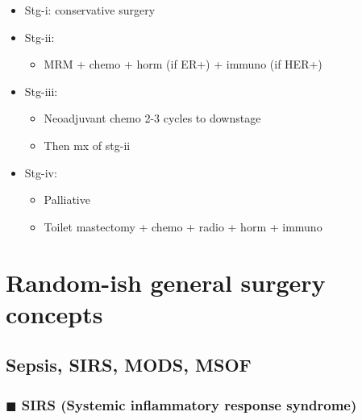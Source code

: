 \documentclass[
  14pt,
]{extarticle}
\providecommand{\tightlist}{%
  \setlength{\itemsep}{0pt}\setlength{\parskip}{0pt}}
\begin{document}
\begin{itemize}
\tightlist
\item
  Stg-i: conservative surgery
\item
  Stg-ii:

  \begin{itemize}
  \tightlist
  \item
    MRM + chemo + horm (if ER+) + immuno (if HER+)
  \end{itemize}
\item
  Stg-iii:

  \begin{itemize}
  \tightlist
  \item
    Neoadjuvant chemo 2-3 cycles to downstage
  \item
    Then mx of stg-ii
  \end{itemize}
\item
  Stg-iv:

  \begin{itemize}
  \tightlist
  \item
    Palliative
  \item
    Toilet mastectomy + chemo + radio + horm + immuno
  \end{itemize}
\end{itemize}

\pagebreak

\hypertarget{random-ish-general-surgery-concepts}{%
\section{Random-ish general surgery
concepts}\label{random-ish-general-surgery-concepts}}

\hypertarget{sepsis-sirs-mods-msof}{%
\subsection{Sepsis, SIRS, MODS, MSOF}\label{sepsis-sirs-mods-msof}}

\hypertarget{blacksquare-sirs-systemic-inflammatory-response-syndrome}{%
\subsubsection{\texorpdfstring{\(\blacksquare\) SIRS (Systemic
inflammatory response
syndrome)}{\textbackslash blacksquare SIRS (Systemic inflammatory response syndrome)}}\label{blacksquare-sirs-systemic-inflammatory-response-syndrome}}
\end{document}
